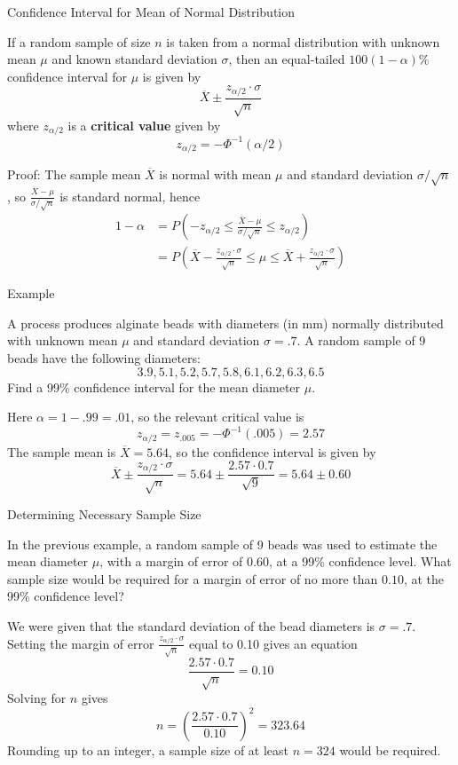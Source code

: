 \documentclass[handout]{beamer}
\renewcommand{\emph}{\textbf}
\begin{document}
\begin{frame}{Confidence Interval for Mean of Normal Distribution}
\begin{block}{}
If a random sample of size $n$ is taken from a normal distribution with unknown mean $\mu$ and known standard deviation $\sigma$, then an equal-tailed $100(1-\alpha)\%$ confidence interval for $\mu$ is given by
$$\overline X \pm \frac{z_{\alpha/2}\cdot\sigma}{\sqrt n}$$
where $z_{\alpha/2}$ is a \emph{critical value} given by
$$z_{\alpha/2} = -\Phi^{-1}(\alpha/2)$$
\end{block}
\pause
Proof: The sample mean $\overline{X}$ is normal with mean $\mu$ and standard deviation $\sigma/\sqrt{n}$, so $\frac{\overline{X}-\mu}{\sigma/\sqrt n}$ is standard normal, hence
\small\begin{align*}
1-\alpha &= P\left(-z_{\alpha/2} \leq \frac{\overline X-\mu}{\sigma/\sqrt n} \leq z_{\alpha/2}\right) \\
&= P\left(\overline X-\frac{z_{\alpha/2}\cdot\sigma}{\sqrt n} \leq \mu \leq \overline X+\frac{z_{\alpha/2}\cdot\sigma}{\sqrt n}\right) 
\end{align*}
\end{frame}

\begin{frame}{Example}
\begin{block}{}
A process produces alginate beads
with diameters (in mm) normally distributed with unknown mean $\mu$ and standard deviation
$\sigma=.7$. A random sample of 9 beads have the following diameters:
$$3.9, 5.1, 5.2, 5.7, 5.8, 6.1, 6.2, 6.3, 6.5$$
Find a 99\% confidence interval for the mean diameter $\mu$.
\end{block}
\pause Here $\alpha=1-.99=.01$, so the relevant critical value is 
$$z_{\alpha/2}=z_{.005} = -\Phi^{-1}(.005) = 2.57$$
\pause The sample mean is $\overline X=5.64$, so the confidence interval is given by
$$\overline X \pm \frac{z_{\alpha/2} \cdot \sigma}{\sqrt n} = 5.64 \pm \frac{2.57 \cdot 0.7}{\sqrt{9}} = 5.64 \pm  0.60$$
\end{frame}

\begin{frame}{Determining Necessary Sample Size}
\begin{block}{}
In the previous example, a random sample of 9 beads was used to estimate the mean diameter $\mu$, with a margin of error of $0.60$, at a 99\% confidence level. What sample size would be required for a margin of error of no more than $0.10$, at the 99\% confidence level?
\end{block}
\pause
We were given that the standard deviation of the bead diameters is $\sigma=.7$. 
 Setting the margin of error $\frac{z_{\alpha/2} \cdot \sigma}{\sqrt n}$ equal to 0.10 gives an equation
$$ \frac{2.57 \cdot 0.7}{\sqrt n} = 0.10$$
\pause Solving for $n$ gives $$n=\left(\frac{2.57\cdot0.7}{0.10}\right)^2=323.64$$
\pause Rounding up to an integer, a sample size of at least $n=324$ would be required.
\end{frame}
\end{document}
